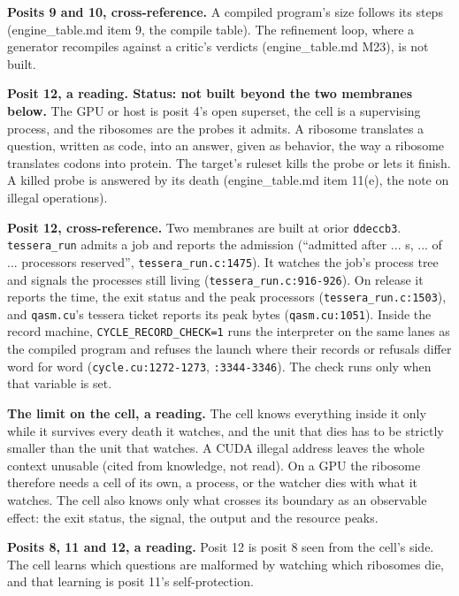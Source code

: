 \textbf{Posits 9 and 10, cross-reference.} A compiled program's size follows its steps (engine\_\allowbreak{}table.md item 9, the compile table). The refinement loop, where a generator recompiles against a critic's verdicts (engine\_\allowbreak{}table.md M23), is not built.

\textbf{Posit 12, a reading. Status: not built beyond the two membranes below.} The GPU or host is posit 4's open superset, the cell is a supervising process, and the ribosomes are the probes it admits. A ribosome translates a question, written as code, into an answer, given as behavior, the way a ribosome translates codons into protein. The target's ruleset kills the probe or lets it finish. A killed probe is answered by its death (engine\_\allowbreak{}table.md item 11(e), the note on illegal operations).

\textbf{Posit 12, cross-reference.} Two membranes are built at orior \texttt{ddeccb3}. \texttt{tessera\_\allowbreak{}run} admits a job and reports the admission (“admitted after ... s, ... of ... processors reserved”, \texttt{tessera\_\allowbreak{}run.\allowbreak{}c:1475}). It watches the job's process tree and signals the processes still living (\texttt{tessera\_\allowbreak{}run.\allowbreak{}c:916-\allowbreak{}926}). On release it reports the time, the exit status and the peak processors (\texttt{tessera\_\allowbreak{}run.\allowbreak{}c:1503}), and \texttt{qasm.\allowbreak{}cu}'s tessera ticket reports its peak bytes (\texttt{qasm.\allowbreak{}cu:1051}). Inside the record machine, \texttt{CYCLE\_\allowbreak{}RECORD\_\allowbreak{}CHECK=1} runs the interpreter on the same lanes as the compiled program and refuses the launch where their records or refusals differ word for word (\texttt{cycle.\allowbreak{}cu:1272-\allowbreak{}1273}, \texttt{:3344-\allowbreak{}3346}). The check runs only when that variable is set.

\textbf{The limit on the cell, a reading.} The cell knows everything inside it only while it survives every death it watches, and the unit that dies has to be strictly smaller than the unit that watches. A CUDA illegal address leaves the whole context unusable (cited from knowledge, not read). On a GPU the ribosome therefore needs a cell of its own, a process, or the watcher dies with what it watches. The cell also knows only what crosses its boundary as an observable effect: the exit status, the signal, the output and the resource peaks.

\textbf{Posits 8, 11 and 12, a reading.} Posit 12 is posit 8 seen from the cell's side. The cell learns which questions are malformed by watching which ribosomes die, and that learning is posit 11's self-protection.

